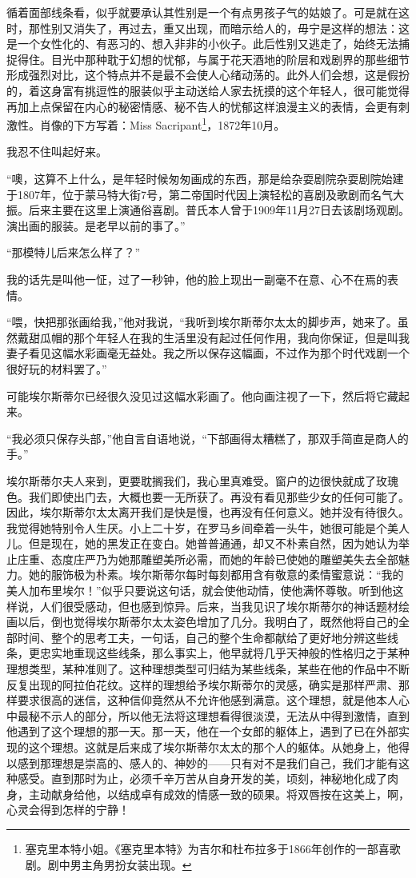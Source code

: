 \par 循着面部线条看，似乎就要承认其性别是一个有点男孩子气的姑娘了。可是就在这时，那性别又消失了，再过去，重又出现，而暗示给人的，毋宁是这样的想法：这是一个女性化的、有恶习的、想入非非的小伙子。此后性别又逃走了，始终无法捕捉得住。目光中那种耽于幻想的忧郁，与属于花天酒地的阶层和戏剧界的那些细节形成强烈对比，这个特点并不是最不会使人心绪动荡的。此外人们会想，这是假扮的，着这身富有挑逗性的服装似乎主动送给人家去抚摸的这个年轻人，很可能觉得再加上点保留在内心的秘密情感、秘不告人的忧郁这样浪漫主义的表情，会更有刺激性。肖像的下方写着：Miss Sacripant\footnote{塞克里本特小姐。《塞克里本特》为吉尔和杜布拉多于1866年创作的一部喜歌剧。剧中男主角男扮女装出现。}，1872年10月。
\par 我忍不住叫起好来。
\par “噢，这算不上什么，是年轻时候匆匆画成的东西，那是给杂耍剧院杂耍剧院始建于1807年，位于蒙马特大街7号，第二帝国时代因上演轻松的喜剧及歌剧而名气大振。后来主要在这里上演通俗喜剧。普氏本人曾于1909年11月27日去该剧场观剧。演出画的服装。是老早以前的事了。”
\par “那模特儿后来怎么样了？”
\par 我的话先是叫他一怔，过了一秒钟，他的脸上现出一副毫不在意、心不在焉的表情。
\par “喂，快把那张画给我，”他对我说，“我听到埃尔斯蒂尔太太的脚步声，她来了。虽然戴甜瓜帽的那个年轻人在我的生活里没有起过任何作用，我向你保证，但是叫我妻子看见这幅水彩画毫无益处。我之所以保存这幅画，不过作为那个时代戏剧一个很好玩的材料罢了。”
\par 可能埃尔斯蒂尔已经很久没见过这幅水彩画了。他向画注视了一下，然后将它藏起来。
\par “我必须只保存头部，”他自言自语地说，“下部画得太糟糕了，那双手简直是商人的手。”
\par 埃尔斯蒂尔夫人来到，更要耽搁我们，我心里真难受。窗户的边很快就成了玫瑰色。我们即使出门去，大概也要一无所获了。再没有看见那些少女的任何可能了。因此，埃尔斯蒂尔太太离开我们是快是慢，也再没有任何意义。她并没有待很久。我觉得她特别令人生厌。小上二十岁，在罗马乡间牵着一头牛，她很可能是个美人儿。但是现在，她的黑发正在变白。她普普通通，却又不朴素自然，因为她认为举止庄重、态度庄严乃为她那雕塑美所必需，而她的年龄已使她的雕塑美失去全部魅力。她的服饰极为朴素。埃尔斯蒂尔每时每刻都用含有敬意的柔情蜜意说：“我的美人加布里埃尔！”似乎只要说这句话，就会使他动情，使他满怀尊敬。听到他这样说，人们很受感动，但也感到惊异。后来，当我见识了埃尔斯蒂尔的神话题材绘画以后，倒也觉得埃尔斯蒂尔太太姿色增加了几分。我明白了，既然他将自己的全部时间、整个的思考工夫，一句话，自己的整个生命都献给了更好地分辨这些线条，更忠实地重现这些线条，那么事实上，他早就将几乎天神般的性格归之于某种理想类型，某种准则了。这种理想类型可归结为某些线条，某些在他的作品中不断反复出现的阿拉伯花纹。这样的理想给予埃尔斯蒂尔的灵感，确实是那样严肃、那样要求很高的迷信，这种信仰竟然从不允许他感到满意。这个理想，就是他本人心中最秘不示人的部分，所以他无法将这理想看得很淡漠，无法从中得到激情，直到他遇到了这个理想的那一天。那一天，他在一个女郎的躯体上，遇到了已在外部实现的这个理想。这就是后来成了埃尔斯蒂尔太太的那个人的躯体。从她身上，他得以感到那理想是崇高的、感人的、神妙的——只有对不是我们自己，我们才能有这种感受。直到那时为止，必须千辛万苦从自身开发的美，顷刻，神秘地化成了肉身，主动献身给他，以结成卓有成效的情感一致的硕果。将双唇按在这美上，啊，心灵会得到怎样的宁静！
